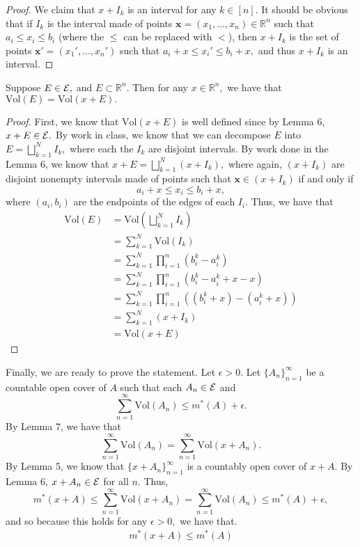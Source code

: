 \documentclass[11pt]{article}
\newcommand{\Vol}{\text{Vol}}
\newcommand{\bbR}{\mathbb{R}}
\begin{document}
\begin{solution}
\begin{proof}
        We claim that $x + I_k$ is an interval for any $k \in [n].$ It should be obvious that if $I_k$ is the interval made of points $\textbf{x} = (x_1, \dots, x_n) \in \bbR^n$ such that $a_i \leq x_i \leq b_i$ (where the $\leq$ can be replaced with $<$), then $x + I_k$ is the set of points $\textbf{x}' = (x_1', \dots, x_n')$ such that $a_i  + x \leq x_i' \leq b_i + x,$ and thus $x + I_k$ is an interval. 
    \end{proof}
    
    \begin{lemma}
        Suppose $E \in \cal E,$ and $E \subset \bbR^n.$ Then for any $x\in \bbR^n,$ we have that $\Vol(E) = \Vol(x + E).$ 
    \end{lemma}
    \begin{proof}
        First, we know that $\Vol(x + E)$ is well defined since by Lemma 6, $x + E \in \cal E.$ By work in class, we know that we can decompose $E$ into $E = \bigsqcup_{k=1}^N I_k,$ where each the $I_k$ are disjoint intervals. By work done in the Lemma 6, we know that $x + E = \bigsqcup_{k=1}^N (x + I_k),$ where again, $(x + I_k)$ are disjoint nonempty intervals made of points such that $\textbf{x} \in (x + I_k)$ if and only if 
        \[a_i  + x \leq x_i \leq b_i + x,\] where $(a_i, b_i)$ are the endpoints of the edges of each $I_i.$ Thus, we have that 
        \begin{align*}
            \Vol(E) &= \Vol(\bigsqcup_{k=1}^N I_k)\\
            &= \sum_{k=1}^N \Vol(I_k)\\
            &= \sum_{k=1}^N \prod_{i=1}^n(b_i^k - a_i^k)\\
            &= \sum_{k=1}^N \prod_{i=1}^n(b_i^k - a_i^k + x - x)\\
            &= \sum_{k=1}^N \prod_{i=1}^n((b_i^k + x) - (a_i^k + x))\\
            &= \sum_{k=1}^N (x + I_k)\\
            &= \Vol(x + E)
        \end{align*}
    \end{proof}
Finally, we are ready to prove the statement. Let $\epsilon>0.$ Let $\{A_n\}_{n=1}^\infty$ be a countable open cover of $A$ such that each $A_n \in \cal E$ and 
\[\sum_{n=1}^\infty \Vol(A_n) \leq m^*(A) + \epsilon.\] By Lemma 7, we have that 
\[\sum_{n=1}^\infty \Vol(A_n) = \sum_{n=1}^\infty\Vol(x + A_n).\] By Lemma 5, we know that $\{x + A_n\}_{n=1}^\infty$ is a countably open cover of $x + A.$ By Lemma 6, $x + A_n \in \cal E$ for all $n.$ Thus, 
\[m^*(x + A) \leq\sum_{n=1}^\infty\Vol(x + A_n) =\sum_{n=1}^\infty \Vol(A_n) \leq m^*(A) + \epsilon,\] and so because this holds for any $\epsilon>0,$ we have that.
\begin{align}
    m^*(x + A) \leq m^*(A)
\end{align}


\end{solution}
\end{document}
